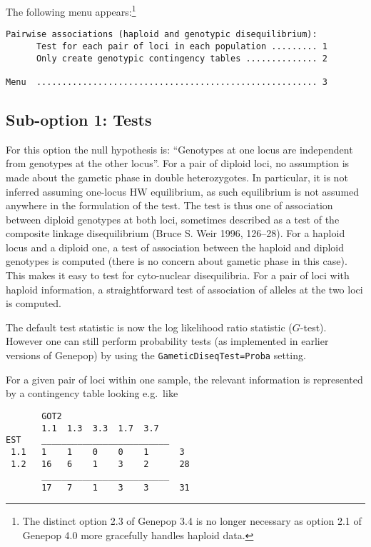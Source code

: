 \documentclass[
  12pt,
]{book}
\begin{document}
The following menu appears:\footnote{The distinct option 2.3 of Genepop 3.4 is no longer necessary as option 2.1 of Genepop 4.0 more gracefully handles haploid data.}

\begin{verbatim}
Pairwise associations (haploid and genotypic disequilibrium):
      Test for each pair of loci in each population ......... 1
      Only create genotypic contingency tables .............. 2

Menu  ....................................................... 3
\end{verbatim}

\hypertarget{sub-option-1-tests}{%
\subsection{Sub-option 1: Tests}\label{sub-option-1-tests}}

For this option the null hypothesis is: ``Genotypes at one locus are independent from genotypes at the other locus''. For a pair of diploid loci, no assumption is made about the gametic phase in double heterozygotes. In particular, it is not inferred assuming one-locus HW equilibrium, as such equilibrium is not assumed anywhere in the formulation of the test. The test is thus one of association between diploid genotypes at both loci, sometimes described as a test of the composite linkage disequilibrium (Bruce S. Weir 1996, 126--28). For a haploid locus and a diploid one, a test of association between the haploid and diploid genotypes is computed (there is no concern about gametic phase in this case). This makes it easy to test for cyto-nuclear disequilibria. For a pair of loci with haploid information, a straightforward test of association of alleles at the two loci is computed.

The default test statistic is now the log likelihood ratio statistic (\(G\)-test). However one can still perform probability tests (as implemented in earlier versions of Genepop) by using the \texttt{GameticDiseqTest=Proba} setting.

For a given pair of loci within one sample, the relevant information is represented by a contingency table looking e.g.~like

\begin{verbatim}
       GOT2
       1.1  1.3  3.3  1.7  3.7
EST    _________________________
 1.1   1    1    0    0    1      3
 1.2   16   6    1    3    2      28
       _________________________
       17   7    1    3    3      31
\end{verbatim}
\end{document}
